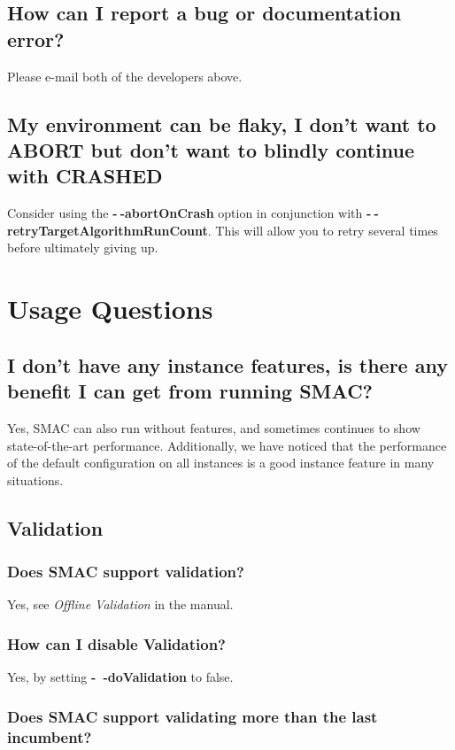 \documentclass[11pt,letterpaper,oneside]{article}
\begin{document}
\subsection{How can I report a bug or documentation error?}
 Please e-mail both of the developers above.

\subsection{My environment can be flaky, I don't want to ABORT but don't want to blindly continue with CRASHED}

	Consider using the \textbf{-$~\!$-abortOnCrash} option in conjunction with \textbf{-$~\!$-retryTargetAlgorithmRunCount}. This will allow you to retry several times before ultimately giving up.


\section{Usage Questions}

\subsection{I don't have any instance features, is there any benefit I can get from running SMAC?}

	Yes, SMAC can also run without features, and sometimes continues to show state-of-the-art performance. Additionally, we have noticed that the performance of the default configuration on all instances is a good instance feature in many situations.

\subsection{Validation}

\subsubsection{Does SMAC support validation?}

	Yes, see \emph{Offline Validation} in the manual.

	
\subsubsection{How can I disable Validation?}

	Yes, by setting \textbf{-~$\!$-doValidation} to false.
	
\subsubsection{Does SMAC support validating more than the last incumbent?}
\end{document}
